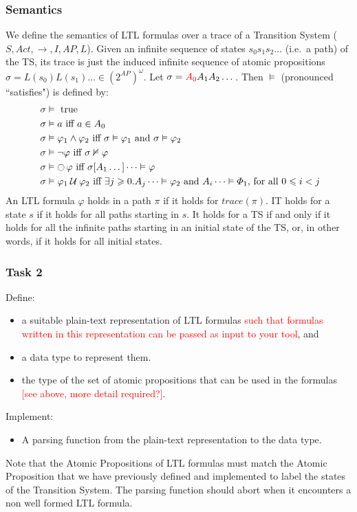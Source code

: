 \documentclass{article}
\begin{document}
\subsubsection*{Semantics}
We define the semantics of LTL formulas over a trace of a Transition System ($S, Act, \rightarrow, I, AP, L$). 
Given an infinite sequence of states $s_0s_1s_2 \dots$ (i.e.~a path) of the TS, 
its trace is just the induced infinite sequence of atomic propositions $ \sigma = L(s_0)L(s_1) \dots \in (2^{AP})^{\omega}$.
Let $\sigma = \textcolor{red}{A_0}A_1A_2 \dots$. Then $\vDash$ (pronounced ``satisfies") is defined by:
\begin{align*}
    &\; \sigma \vDash \text{ true} \\
    &\; \sigma \vDash a \text{ iff } a \in A_0 \\
    &\; \sigma \vDash \varphi_1 \land \varphi_2 \text{ iff } \sigma \vDash \varphi_1 \text{ and } \sigma \vDash \varphi_2 \\
    &\; \sigma \vDash \neg \varphi \text{ iff } \sigma \nvDash \varphi \\
    &\; \sigma \vDash \mathop{\ocircle}{\varphi} \text{ iff } \sigma [A_1 \dots] \dots \vDash \varphi \\
    &\; \sigma \vDash \varphi_1 \mathbin{\mathcal{U}} \varphi_2 \text{ iff } \exists j \geqslant 0 .  A_j \dots \vDash \varphi_2 \text{ and } A_i \dots \vDash \varPhi_1 \text{, for all } 0 \leqslant  i < j
\end{align*}
An LTL formula $\varphi$ holds in a path $\pi$ if it holds for $trace(\pi)$. 
IT holds for a state $s$ if it holds for all paths starting in $s$.
It holds for a TS if and only if it holds for all the infinite paths 
starting in an initial state of the TS, or, in other words, if it holds for all initial states.

\subsubsection*{Task 2}
Define:
\begin{itemize}
    \item a suitable plain-text representation of LTL formulas \textcolor{red}{such that formulas written in this representation can be passed as input to your tool}, and
    \item a data type to represent them. 
    \item the type of the set of atomic propositions that can be used in the formulas \textcolor{red}{[see above, more detail required?]}.
\end{itemize}
Implement: 
\begin{itemize}
    \item A parsing function from the plain-text representation to the data type.
\end{itemize}
Note that the Atomic Propositions of LTL formulas must match the Atomic Proposition that we have previously 
defined and implemented to label the states of the Transition System. The parsing function should abort 
when it encounters a non well formed LTL formula.
\end{document}
